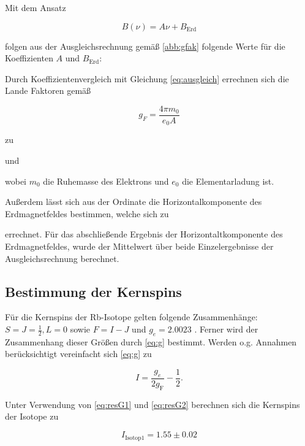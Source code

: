 Mit dem Ansatz

\begin{equation}
B(\nu) = A\nu + B_\text{Erd}
\end{equation}

folgen aus der Ausgleichsrechnung gemäß \autoref{abb:gfak} folgende Werte für die Koeffizienten $A$ und $B_\text{Erd}$:



Durch Koeffizientenvergleich mit Gleichung \ref{eq:ausgleich} errechnen sich die Lande Faktoren gemäß

\begin{equation}
g_F = \frac{4\pi m_0}{e_0 A}
\end{equation}

zu



und



wobei $m_0$ die Ruhemasse des Elektrons und $e_0$ die Elementarladung ist.

Außerdem lässt sich aus der Ordinate die Horizontalkomponente des Erdmagnetfeldes bestimmen,
welche sich zu



errechnet. Für das abschließende Ergebnis der Horizontaltkomponente des Erdmagnetfeldes, wurde der Mittelwert über beide Einzelergebnisse der Ausgleichsrechnung berechnet.

\subsection{Bestimmung der Kernspins}
Für die Kernspins der Rb-Isotope gelten folgende Zusammenhänge: $S = J = \frac{1}{2} , L = 0$ sowie $F = I - J$ und $g_e = 2.0023$ \cite{landeE-}. Ferner wird
der Zusammenhang dieser Größen durch \autoref{eq:g} bestimmt. Werden o.g. Annahmen berücksichtigt vereinfacht sich \autoref{eq:g} zu

\begin{equation}
I = \frac{g_e}{2g_\text{F}} - \frac{1}{2}.
\end{equation}

Unter Verwendung von \autoref{eq:resG1} und \autoref{eq:resG2} berechnen sich die Kernspins der Isotope zu

\begin{equation}
I_\text{Isotop1} = 1.55 \pm 0.02 
\label{eq:result1}
\end{equation}

